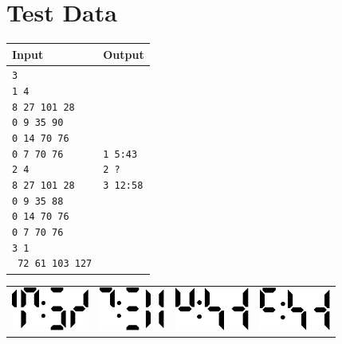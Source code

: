 \documentclass[a4paper,11pt,oneside]{article}
\begin{document}
\section{Test Data}
\begin{tabularx}{\textwidth}{|X|X|}
	\hline
	Input & Output \\ \hline
	\parbox[t]{5cm}{
	\texttt{3\\
			1 4\\
			8 27 101 28\\
			0 9 35 90\\
			0 14 70 76\\
			0 7 70 76\\
			2 4\\
			8 27 101 28\\
			0 9 35 88\\
			0 14 70 76\\
			0 7 70 76\\
			3 1\\\
			72 61 103 127\\
	}} & \parbox[t]{5cm}{
	\texttt{1 5:43\\
			2 ?\\
			3 12:58\\
	}}\\
	\hline
\end{tabularx}
\begin{center}
\begin{tabularx}{7in}{X X X X}
\includegraphics[height=40pt]{./assets/testclock_1.eps}&
\includegraphics[height=40pt]{./assets/testclock_2.eps}&
\includegraphics[height=40pt]{./assets/testclock_3.eps}&
\includegraphics[height=40pt]{./assets/clock_4.eps}
\end{tabularx}
\end{center}
\end{document}
